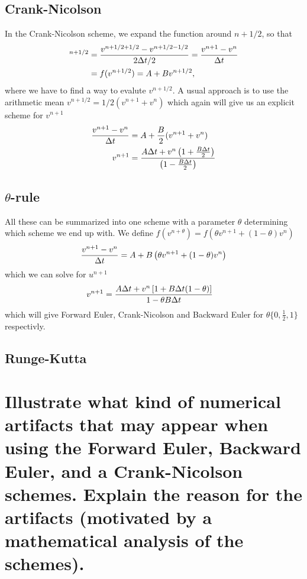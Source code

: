 \documentclass[a4paper,10pt]{article}
\renewcommand{\(}{\left(}
\renewcommand{\)}{\right)}
\begin{document}
\subsection{Crank-Nicolson}
In the Crank-Nicolson scheme, we expand the function around $n+1/2$, so that
\begin{align*}
  [D_tv = f(v)]^{n+1/2} &= {v^{n+1/2 + 1/2} - v^{n+1/2 - 1/2} \over 2\Delta t/2} = {v^{n+1} - v^{n} \over \Delta t}\\
  &= f(v^{n+1/2}) = A + Bv^{n+1/2},
\end{align*}
where we have to find a way to evalute $v^{n+1/2}$. A usual approach is to use the arithmetic mean $v^{n+1/2} = 1/2(v^{n+1} + v^n)$ which again will give us an explicit scheme for $v^{n+1}$
\begin{align*}
  {v^{n+1} - v^{n} \over \Delta t} &= A + \frac{B}{2}(v^{n+1} + v^n)\\
  v^{n+1} &= {A\Delta t + v^n\left(1 + \frac{B\Delta t}{2}\right) \over \left(1 - \frac{B\Delta t}{2}\right)}
\end{align*}
\subsection{$\theta$-rule}
All these can be summarized into one scheme with a parameter $\theta$ determining which scheme we end up with. We define $f(v^{n+\theta})=f(\theta v^{n+1} + (1-\theta)v^n)$
\begin{align*}
  {v^{n+1} - v^n \over \Delta t} = A + B\left(\theta v^{n+1} + (1-\theta)v^n\right)
\end{align*}
which we can solve for $u^{n+1}$
\begin{align}
  \label{eq:theta}
  v^{n+1} &= {A\Delta t + v^n\left[1 + B\Delta t(1-\theta) \right] \over 1 - \theta B\Delta t}
\end{align}
which will give Forward Euler, Crank-Nicolson and Backward Euler for $\theta \{0,\frac{1}{2},1\}$ respectivly.
\subsection{Runge-Kutta}

\section{Illustrate what kind of numerical artifacts that may appear when using the Forward Euler, Backward Euler, and a Crank-Nicolson schemes. Explain the reason for the artifacts (motivated by a mathematical analysis of the schemes).}
\end{document}
